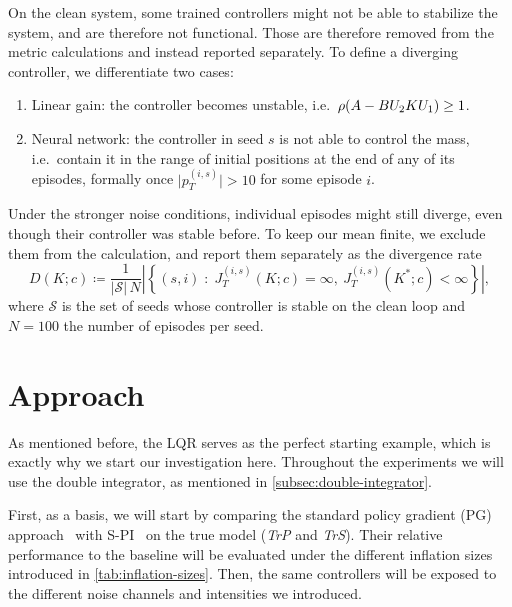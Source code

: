 On the clean system, some trained controllers might not be able to stabilize the system,
and are therefore not functional. Those are therefore removed from the metric calculations
and instead reported separately. To define a diverging controller, we differentiate two cases:
\begin{enumerate}
    \item Linear gain: the controller becomes unstable, i.e.\
    $\operatorname{\rho}(A - B U_2 K U_1) \geq 1$.
    \item Neural network: the controller in seed $s$ is not able to control the mass,
    i.e.\ contain it in the range of initial positions at the end of any of
    its episodes, formally once $\lvert p^{(i,s)}_T \rvert > 10$ for some episode $i$.
\end{enumerate}

Under the stronger noise conditions, individual episodes might still diverge, even
though their controller was stable before. To keep our mean finite, we exclude them
from the calculation, and report them separately as the divergence rate
\begin{equation}
    \label{eq:divergence-rate}
    D(K; c) \coloneqq \frac{1}{\lvert \mathcal{S} \rvert\, N}
    \left\lvert \left\{ (s, i) \;:\; J^{(i,s)}_T(K; c) = \infty ,\ J^{(i,s)}_T(K^{*}; c) < \infty \right\} \right\rvert ,
\end{equation}
where $\mathcal{S}$ is the set of seeds whose controller is stable on the clean loop and $N = 100$ the
number of episodes per seed.


\section{Approach}
\label{sec:approach}

As mentioned before, the LQR serves as the perfect starting example,
which is exactly why we start our investigation here. Throughout the experiments we will
use the double integrator, as mentioned in \cref{subsec:double-integrator}.

First, as a basis, we will start by comparing
the standard policy gradient (PG) approach~\cite{Fazel2018Global} with S-PI~\cite{Park2020Structured}
on the true model (\emph{TrP} and \emph{TrS}). Their relative performance to the baseline will be evaluated under the different
inflation sizes introduced in \cref{tab:inflation-sizes}. Then, the same controllers will be exposed
to the different noise channels and intensities we introduced.

